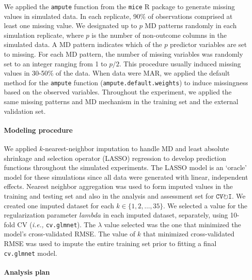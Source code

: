 \documentclass[AMA,STIX1COL,doublespace]{WileyNJD-v2}
\begin{document}
We applied the \texttt{ampute} function from the \texttt{mice} R package
to generate missing values in simulated data. In each replicate, 90\% of
observations comprised at least one missing value. We designated up to
\(p\) MD patterns randomly in each simulation replicate, where \(p\) is
the number of non-outcome columns in the simulated data. A MD pattern
indicates which of the \(p\) predictor variables are set to missing. For
each MD pattern, the number of missing variables was randomly set to an
integer ranging from 1 to \(p/2\). This procedure usually induced
missing values in 30-50\% of the data. When data were MAR, we applied
the default method for the \texttt{ampute} function
(\texttt{ampute.default.weights}) to induce missingness based on the
observed variables. Throughout the experiment, we applied the same
missing patterns and MD mechanism in the training set and the external
validation set.

\paragraph{Modeling procedure}

We applied \(k\)-nearest-neighbor imputation to handle MD and least
absolute shrinkage and selection operator (LASSO) regression to develop
prediction functions throughout the simulated experiments. The LASSO
model is an `oracle' model for these simulations since all data were
generated with linear, independent effects. Nearest neighbor aggregation
was used to form imputed values in the training and testing set and also
in the analysis and assessment set for
$\texttt{CV}\!\circlearrowright\!\texttt{I}$. We created one imputed
dataset for each \(k \in \lbrace 1, 2, \ldots, 35\rbrace\). We selected
a value for the regularization parameter \(lambda\) in each imputed
dataset, separately, using 10-fold CV
(\textit{i.e., }\texttt{cv.glmnet}). The \(\lambda\) value selected was
the one that minimized the model's cross-validated RMSE. The value of
\(k\) that minimized cross-validated RMSE was used to impute the entire
training set prior to fitting a final \texttt{cv.glmnet} model.

\paragraph{Analysis plan}
\end{document}
